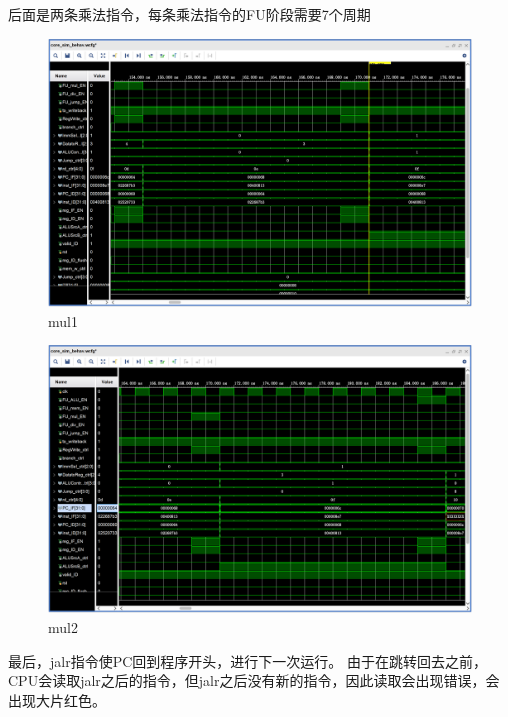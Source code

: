 后面是两条乘法指令，每条乘法指令的FU阶段需要7个周期

\begin{figure}[H]
    \centering
    \includegraphics[width=1.0\textwidth]{figs/7.png}
    \caption{mul1}
    \label{Fig.10}
\end{figure}

\begin{figure}[H]
	\centering
	\includegraphics[width=1.0\textwidth]{figs/9.png}
	\caption{mul2}
	\label{Fig.12}
\end{figure}

最后，jalr指令使PC回到程序开头，进行下一次运行。
由于在跳转回去之前，CPU会读取jalr之后的指令，但jalr之后没有新的指令，因此读取会出现错误，会出现大片红色。

